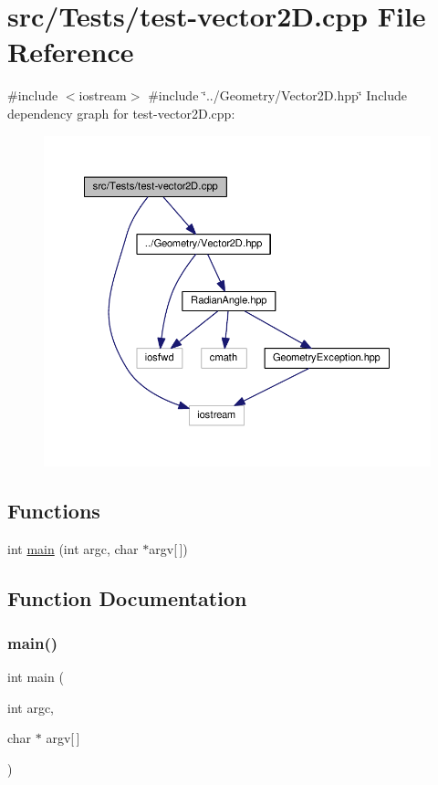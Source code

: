 \hypertarget{test-vector2_d_8cpp}{}\section{src/\+Tests/test-\/vector2D.cpp File Reference}
\label{test-vector2_d_8cpp}
{\ttfamily \#include $<$iostream$>$}\newline
{\ttfamily \#include \char`\"{}../\+Geometry/\+Vector2\+D.\+hpp\char`\"{}}\newline
Include dependency graph for test-\/vector2D.cpp\+:\nopagebreak
\begin{figure}[H]
\begin{center}
\leavevmode
\includegraphics[width=350pt]{test-vector2_d_8cpp__incl}
\end{center}
\end{figure}
\subsection*{Functions}
\begin{DoxyCompactItemize}
\item 
int \hyperlink{test-vector2_d_8cpp_a0ddf1224851353fc92bfbff6f499fa97}{main} (int argc, char $\ast$argv\mbox{[}$\,$\mbox{]})
\end{DoxyCompactItemize}


\subsection{Function Documentation}
\hypertarget{test-vector2_d_8cpp_a0ddf1224851353fc92bfbff6f499fa97}{}\label{test-vector2_d_8cpp_a0ddf1224851353fc92bfbff6f499fa97} 
\subsubsection{\texorpdfstring{main()}{main()}}
{\footnotesize\ttfamily int main (\begin{DoxyParamCaption}\item[{int}]{argc,  }\item[{char $\ast$}]{argv\mbox{[}$\,$\mbox{]} }\end{DoxyParamCaption})}

